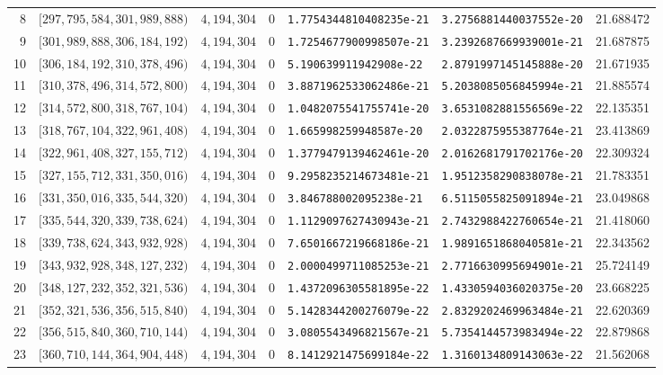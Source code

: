 \documentclass[11pt]{article}
\newcommand{\1}{\mathbf 1}
\theoremstyle{plain}
\theoremstyle{definition}
\theoremstyle{remark}
\begin{document}
\begin{landscape}
\begin{longtable}{@{}r r r r l l r@{}}
8 & $[297,795,584,301,989,888)$ & $4,194,304$ & 0 & \texttt{1.7754344810408235e-21} & \texttt{3.2756881440037552e-20} & 21.688472\\
9 & $[301,989,888,306,184,192)$ & $4,194,304$ & 0 & \texttt{1.7254677900998507e-21} & \texttt{3.2392687669939001e-21} & 21.687875\\
10 & $[306,184,192,310,378,496)$ & $4,194,304$ & 0 & \texttt{5.190639911942908e-22} & \texttt{2.8791997145145888e-20} & 21.671935\\
11 & $[310,378,496,314,572,800)$ & $4,194,304$ & 0 & \texttt{3.8871962533062486e-21} & \texttt{5.2038085056845994e-21} & 21.885574\\
12 & $[314,572,800,318,767,104)$ & $4,194,304$ & 0 & \texttt{1.0482075541755741e-20} & \texttt{3.6531082881556569e-22} & 22.135351\\
13 & $[318,767,104,322,961,408)$ & $4,194,304$ & 0 & \texttt{1.665998259948587e-20} & \texttt{2.0322875955387764e-21} & 23.413869\\
14 & $[322,961,408,327,155,712)$ & $4,194,304$ & 0 & \texttt{1.3779479139462461e-20} & \texttt{2.0162681791702176e-20} & 22.309324\\
15 & $[327,155,712,331,350,016)$ & $4,194,304$ & 0 & \texttt{9.2958235214673481e-21} & \texttt{1.9512358290838078e-21} & 21.783351\\
16 & $[331,350,016,335,544,320)$ & $4,194,304$ & 0 & \texttt{3.846788002095238e-21} & \texttt{6.5115055825091894e-21} & 23.049868\\
17 & $[335,544,320,339,738,624)$ & $4,194,304$ & 0 & \texttt{1.1129097627430943e-21} & \texttt{2.7432988422760654e-21} & 21.418060\\
18 & $[339,738,624,343,932,928)$ & $4,194,304$ & 0 & \texttt{7.6501667219668186e-21} & \texttt{1.9891651868040581e-21} & 22.343562\\
19 & $[343,932,928,348,127,232)$ & $4,194,304$ & 0 & \texttt{2.0000499711085253e-21} & \texttt{2.7716630995694901e-21} & 25.724149\\
20 & $[348,127,232,352,321,536)$ & $4,194,304$ & 0 & \texttt{1.4372096305581895e-22} & \texttt{1.4330594036020375e-20} & 23.668225\\
21 & $[352,321,536,356,515,840)$ & $4,194,304$ & 0 & \texttt{5.1428344200276079e-22} & \texttt{2.8329202469963484e-21} & 22.620369\\
22 & $[356,515,840,360,710,144)$ & $4,194,304$ & 0 & \texttt{3.0805543496821567e-21} & \texttt{5.7354144573983494e-22} & 22.879868\\
23 & $[360,710,144,364,904,448)$ & $4,194,304$ & 0 & \texttt{8.1412921475699184e-22} & \texttt{1.3160134809143063e-22} & 21.562068\\

\end{longtable}
\end{landscape}
\end{document}
